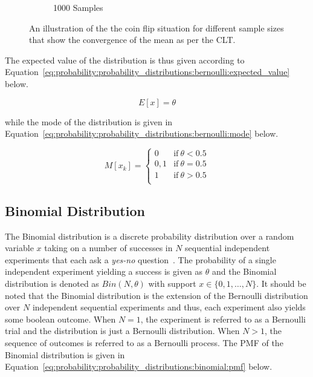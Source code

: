\begin{figure}[htbp]
\begin{subfigure}{0.49\textwidth}
            \caption{1000 Samples}
            \label{fig:probability:probability_distributions:bernoulli:coin_1000}
      \end{subfigure}
      \par\bigskip
      \caption{An illustration of the the coin flip situation for different sample sizes that show the convergence of the mean as per the \ac{CLT}.}
      \label{fig:probability:probability_distributions:bernoulli:coin}
\end{figure}

The expected value of the distribution is thus given according to Equation~\eqref{eq:probability:probability_distributions:bernoulli:expected_value} below.

\begin{equation}
      \label{eq:probability:probability_distributions:bernoulli:expected_value}
      E[x] = \theta
\end{equation}

while the mode of the distribution is given in Equation~\eqref{eq:probability:probability_distributions:bernoulli:mode} below.

\begin{equation}
      \label{eq:probability:probability_distributions:bernoulli:mode}
      M[x_{k}] =
      \begin{cases}
            0   & \text{if}\ \theta < 0.5 \\
            0,1 & \text{if}\ \theta = 0.5 \\
            1   & \text{if}\ \theta > 0.5 \\
      \end{cases}
\end{equation}




\subsection{Binomial Distribution}
\label{sec:probability:probability_distributions:bin}


The Binomial distribution is a discrete probability distribution over a random variable $x$ taking on a number of successes in $N$ sequential independent experiments that each ask a \textit{yes-no} question~\cite{ref:wackerly:2014}. The probability of a single independent experiment yielding a success is given as $\theta$ and the Binomial distribution is denoted as $Bin(N, \theta)$ with support $x \in \{0, 1, \dots, N\}$.  It should be noted that the Binomial distribution is the extension of the Bernoulli distribution over $N$ independent sequential experiments and thus, each experiment also yields some boolean outcome. When $N=1$, the experiment is referred to as a Bernoulli trial and the distribution is just a Bernoulli distribution. When $N > 1$, the sequence of outcomes is referred to as a Bernoulli process. The \ac{PMF} of the Binomial distribution is given in Equation~\eqref{eq:probability:probability_distributions:binomial:pmf} below.

